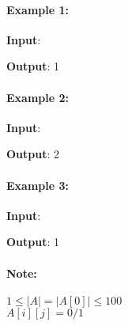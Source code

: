 \paragraph{Example 1:}
\begin{flushleft}
\textbf{Input}: 
\begin{figure}[H]
\end{figure}
\textbf{Output}: 1
\end{flushleft}
\paragraph{Example 2:}
\begin{flushleft}
\textbf{Input}:
\begin{figure}[H]
\end{figure}
\end{flushleft}
\textbf{Output}: 2
\paragraph{Example 3:}
\begin{flushleft}
\textbf{Input}:
\begin{figure}[H]
\end{figure}
\textbf{Output}: 1
\end{flushleft}
\paragraph{Note:}
\begin{flushleft}
$1\leq |A| = |A[0]| \leq 100$
\\
$A[i][j] = 0/1$
\end{flushleft}
